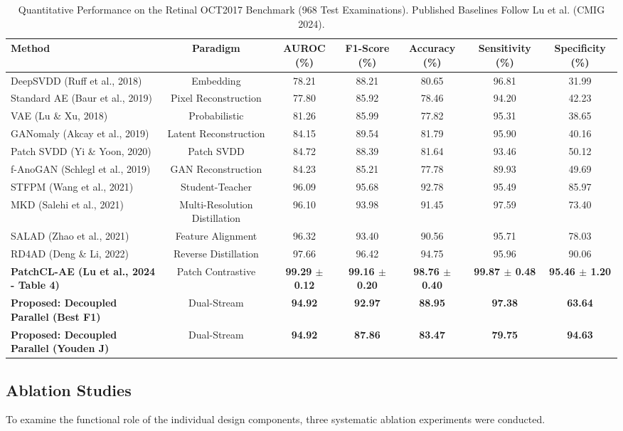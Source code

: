 \documentclass[journal]{IEEEtran}
\begin{document}
\begin{table}[t]
\centering
\caption{Quantitative Performance on the Retinal OCT2017 Benchmark (968 Test Examinations). Published Baselines Follow Lu et al. (CMIG 2024).}
\label{tab:retinal_oct}
\begin{tabular}{lcccccc}
\toprule
Method & Paradigm & AUROC (\%) & F1-Score (\%) & Accuracy (\%) & Sensitivity (\%) & Specificity (\%) \\
\midrule
DeepSVDD (Ruff et al., 2018) & Embedding & 78.21 & 88.21 & 80.65 & 96.81 & 31.99 \\
Standard AE (Baur et al., 2019) & Pixel Reconstruction & 77.80 & 85.92 & 78.46 & 94.20 & 42.23 \\
VAE (Lu \& Xu, 2018) & Probabilistic & 81.26 & 85.99 & 77.82 & 95.31 & 38.65 \\
GANomaly (Akcay et al., 2019) & Latent Reconstruction & 84.15 & 89.54 & 81.79 & 95.90 & 40.16 \\
Patch SVDD (Yi \& Yoon, 2020) & Patch SVDD & 84.72 & 88.39 & 81.64 & 93.46 & 50.12 \\
f-AnoGAN (Schlegl et al., 2019) & GAN Reconstruction & 84.23 & 85.21 & 77.78 & 89.93 & 49.69 \\
STFPM (Wang et al., 2021) & Student-Teacher & 96.09 & 95.68 & 92.78 & 95.49 & 85.97 \\
MKD (Salehi et al., 2021) & Multi-Resolution Distillation & 96.10 & 93.98 & 91.45 & 97.59 & 73.40 \\
SALAD (Zhao et al., 2021) & Feature Alignment & 96.32 & 93.40 & 90.56 & 95.71 & 78.03 \\
RD4AD (Deng \& Li, 2022) & Reverse Distillation & 97.66 & 96.42 & 94.75 & 95.96 & 90.06 \\
\midrule
\textbf{PatchCL-AE (Lu et al., 2024 - Table 4)} & Patch Contrastive & \textbf{99.29 $\pm$ 0.12} & \textbf{99.16 $\pm$ 0.20} & \textbf{98.76 $\pm$ 0.40} & \textbf{99.87 $\pm$ 0.48} & \textbf{95.46 $\pm$ 1.20} \\
\midrule
\textbf{Proposed: Decoupled Parallel (Best F1)} & Dual-Stream & \textbf{94.92} & \textbf{92.97} & \textbf{88.95} & \textbf{97.38} & \textbf{63.64} \\
\textbf{Proposed: Decoupled Parallel (Youden J)} & Dual-Stream & \textbf{94.92} & \textbf{87.86} & \textbf{83.47} & \textbf{79.75} & \textbf{94.63} \\
\bottomrule
\end{tabular}
\end{table}

\subsection{Ablation Studies}
To examine the functional role of the individual design components, three systematic ablation experiments were conducted.
\end{document}
